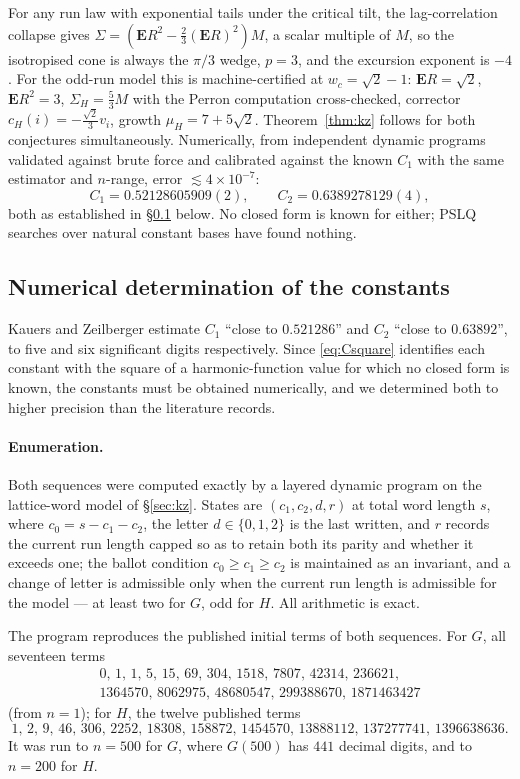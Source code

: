 \documentclass[11pt]{article}
\theoremstyle{definition}
\newcommand{\E}{\mathbf{E}}
\begin{document}
For any run law with exponential tails under the critical tilt, the
lag-correlation collapse gives $\Sigma=(\E R^{2}-\tfrac23(\E R)^{2})M$, a
scalar multiple of $M$, so the isotropised cone is always the $\pi/3$ wedge,
$p=3$, and the excursion exponent is $-4$. For the odd-run model this is
machine-certified at $w_c=\sqrt2-1$: $\E R=\sqrt2$, $\E R^{2}=3$,
$\Sigma_H=\tfrac53M$ with the Perron computation cross-checked, corrector
$c_H(i)=-\tfrac{\sqrt2}{3}v_i$, growth $\mu_H=7+5\sqrt2$. Theorem~\ref{thm:kz}
follows for both conjectures simultaneously. Numerically, from independent
dynamic programs validated against brute force and calibrated against the known
$C_1$ with the same estimator and $n$-range, error $\lesssim4\times10^{-7}$:
\[
  C_1=0.52128605909(2),\qquad C_2=0.6389278129(4),
\]
both as established in \S\ref{sec:c1num} below.
No closed form is known for either; PSLQ searches over natural constant bases
have found nothing.

\subsection{Numerical determination of the constants}\label{sec:c1num}

Kauers and Zeilberger \cite{KZ} estimate $C_1$ ``close to $0.521286$'' and
$C_2$ ``close to $0.63892$'', to five and six significant digits
respectively. Since \eqref{eq:Csquare} identifies each constant with the
square of a harmonic-function value for which no closed form is known, the
constants must be obtained numerically, and we determined both to higher
precision than the literature records.

\paragraph{Enumeration.} Both sequences were computed exactly by a layered
dynamic program on the lattice-word model of \S\ref{sec:kz}. States are
$(c_1,c_2,d,r)$ at total word length $s$, where $c_0=s-c_1-c_2$, the letter
$d\in\{0,1,2\}$ is the last written, and $r$ records the current run length
capped so as to retain both its parity and whether it exceeds one; the ballot
condition $c_0\ge c_1\ge c_2$ is maintained as an invariant, and a change of
letter is admissible only when the current run length is admissible for the
model --- at least two for $G$, odd for $H$. All arithmetic is exact.

The program reproduces the published initial terms of both sequences. For
$G$, all seventeen terms
\[
  \begin{array}{l}
  0,\,1,\,1,\,5,\,15,\,69,\,304,\,1518,\,7807,\,42314,\,236621,\\[2pt]
  1364570,\,8062975,\,48680547,\,299388670,\,1871463427
  \end{array}
\]
(from $n=1$); for $H$, the twelve published terms
\[
  1,\,2,\,9,\,46,\,306,\,2252,\,18308,\,158872,\,1454570,\,13888112,\,
  137277741,\,1396638636 .
\]
It was run to $n=500$ for $G$, where $G(500)$ has $441$ decimal digits, and to
$n=200$ for $H$.
\end{document}
